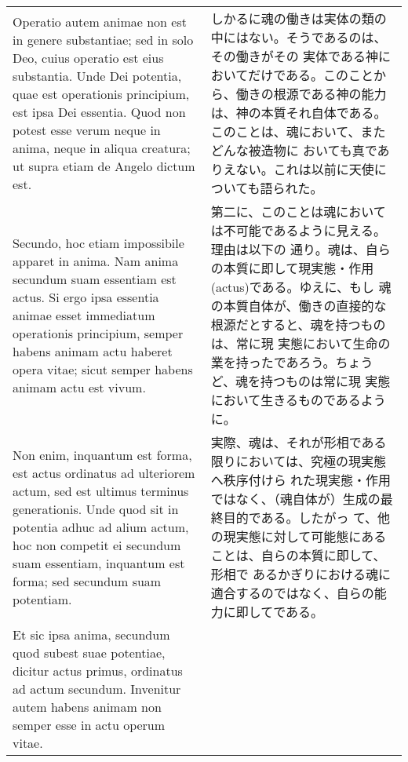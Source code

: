 \documentclass[paper=a4paper,fontsize=10pt,jafontsize=9pt,titlepage]{jlreq}
\begin{document}
\begin{longtable}{p{21em}p{21em}}
\\


 Operatio autem animae non est in genere substantiae; sed in solo Deo,
cuius operatio est eius substantia. Unde Dei potentia, quae est
operationis principium, est ipsa Dei essentia. Quod non potest esse
verum neque in anima, neque in aliqua creatura; ut supra etiam de
Angelo dictum est.



&

しかるに魂の働きは実体の類の中にはない。そうであるのは、その働きがその
実体である神においてだけである。このことから、働きの根源である神の能力
は、神の本質それ自体である。このことは、魂において、またどんな被造物に
おいても真でありえない。これは以前に天使についても語られた。


\\


Secundo, hoc etiam impossibile apparet in anima.  Nam anima secundum
suam essentiam est actus. Si ergo ipsa essentia animae esset
immediatum operationis principium, semper habens animam actu haberet
opera vitae; sicut semper habens animam actu est vivum.


&

 第二に、このことは魂においては不可能であるように見える。理由は以下の
 通り。魂は、自らの本質に即して現実態・作用(actus)である。ゆえに、もし
 魂の本質自体が、働きの直接的な根源だとすると、魂を持つものは、常に現
 実態において生命の業を持ったであろう。ちょうど、魂を持つものは常に現
 実態において生きるものであるように。


\\


 Non enim, inquantum est forma, est actus ordinatus ad ulteriorem
actum, sed est ultimus terminus generationis. Unde quod sit in
potentia adhuc ad alium actum, hoc non competit ei secundum suam
essentiam, inquantum est forma; sed secundum suam potentiam.

&


 実際、魂は、それが形相である限りにおいては、究極の現実態へ秩序付けら
 れた現実態・作用ではなく、（魂自体が）生成の最終目的である。したがっ
 て、他の現実態に対して可能態にあることは、自らの本質に即して、形相で
 あるかぎりにおける魂に適合するのではなく、自らの能力に即してである。

\\

 Et sic ipsa anima, secundum quod subest suae potentiae, dicitur actus
primus, ordinatus ad actum secundum. Invenitur autem habens animam non
semper esse in actu operum vitae.


\end{longtable}
\end{document}
